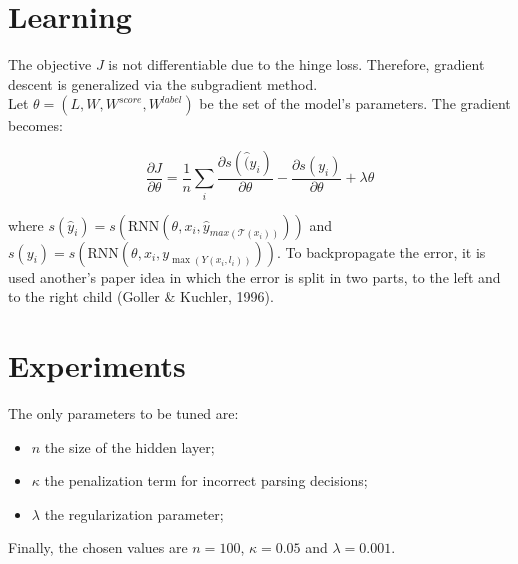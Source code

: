 \section{Learning}

The objective $J$ is not differentiable due to the hinge loss. Therefore,
gradient descent is generalized via the subgradient method.\\
Let $\theta = (L, W, W^{score}, W^{label})$ be the set of the model's
parameters. The gradient becomes:

\begin{equation}
\frac{\partial{J}}{\partial{\theta}} = 
\frac{1}{n} \sum_i 
\frac{\partial{s(\hat(y_i)}}{\partial{\theta}} 
- \frac{\partial{s(y_i)}}{\partial{\theta}}
+ \lambda \theta
\end{equation}

where $s(\hat{y}_i) = s(\text{RNN}(\theta, x_i, \hat{y}_{max(\mathcal{T}(x_i))}))$
and $s(y_i) = s(\text{RNN}(\theta, x_i, y_{\max(Y(x_i, l_i))}))$.
To backpropagate the error, it is used another's paper idea in which the error
is split in two parts, to the left and to the right child (Goller \& Kuchler,
1996).

\section{Experiments}

The only parameters to be tuned are:
\begin{itemize}
	\item $n$ the size of the hidden layer;
	\item $\kappa$ the penalization term for incorrect parsing decisions;
	\item $\lambda$ the regularization parameter;
\end{itemize}

Finally, the chosen values are $n = 100$, $\kappa = 0.05$ and $\lambda = 0.001$.

